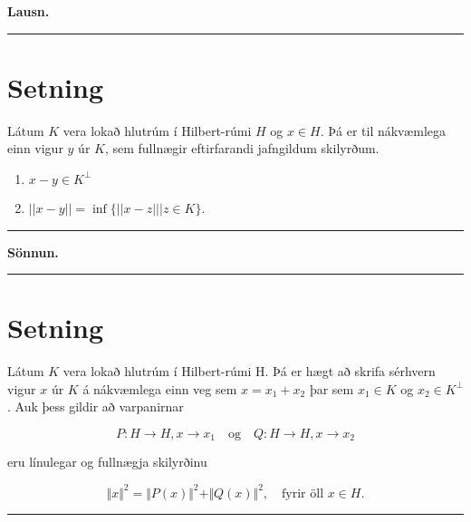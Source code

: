 \documentclass[]{book}
\providecommand{\tightlist}{%
  \setlength{\itemsep}{0pt}\setlength{\parskip}{0pt}}
\begin{document}
\textbf{Lausn.}

\begin{center}\rule{0.5\linewidth}{\linethickness}\end{center}

\hypertarget{setning-79}{%
\section*{Setning}\label{setning-79}}

Látum \(K\) vera lokað hlutrúm í Hilbert-rúmi \(H\) og \(x\in H\). Þá er til nákvæmlega einn vigur \(y\) úr \(K\), sem fullnægir eftirfarandi jafngildum skilyrðum.

\begin{enumerate}
\def\labelenumi{\arabic{enumi}.}
\tightlist
\item
  \(x - y\in K^\perp\)
\item
  \(||x - y|| = \inf\{||x - z|| | z \in K\}\).
\end{enumerate}

\begin{center}\rule{0.5\linewidth}{\linethickness}\end{center}

\textbf{Sönnun.}

\begin{center}\rule{0.5\linewidth}{\linethickness}\end{center}

\hypertarget{setning-80}{%
\section*{Setning}\label{setning-80}}

Látum \(K\) vera lokað hlutrúm í Hilbert-rúmi H. Þá er hægt að skrifa sérhvern vigur \(x\) úr \(K\) á nákvæmlega einn veg sem \(x = x_1 + x_2\) þar sem \(x_1 \in K\) og \(x_2 \in K^\perp\). Auk þess gildir að varpanirnar

\[
P:H\rightarrow H, x\rightarrow x_1 \quad \text{og} \quad Q:H\rightarrow H, x\rightarrow x_2
\]

eru línulegar og fullnægja skilyrðinu

\[
\Vert x\Vert^2 = \Vert P(x)\Vert^2 + \Vert Q(x)\Vert^2, \quad \text{fyrir öll }x\in H.
\]

\begin{center}\rule{0.5\linewidth}{\linethickness}\end{center}
\end{document}
